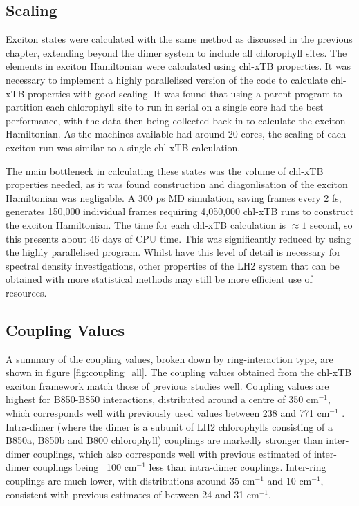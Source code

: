 \subsection{Scaling}
\label{subsec:specdens_scaling}

Exciton states were calculated with the same method as discussed in the previous 
chapter, extending beyond the dimer system to include all chlorophyll sites. The
elements in exciton Hamiltonian were calculated using chl-xTB properties. It was
necessary to implement a highly parallelised version of the code to calculate chl-xTB
properties with good scaling. It was found that using a parent program to partition
each chlorophyll site to run in serial on a single core had the best performance,
with the data then being collected back in to calculate the exciton Hamiltonian.
As the machines available had around 20 cores, the scaling of each exciton run was
similar to a single chl-xTB calculation.

The main bottleneck in calculating these states was the volume of chl-xTB properties
needed, as it was found construction and diagonlisation of the exciton Hamiltonian
was negligable. A 300 ps MD simulation, saving frames every 2 fs, generates 150,000
individual frames requiring 4,050,000 chl-xTB runs to construct the exciton Hamiltonian.
The time for each chl-xTB calculation is $\approx 1$ second, so this presents about
46 days of CPU time. This was significantly reduced by using the highly parallelised
program. Whilst have this level of detail is necessary for spectral density investigations,
other properties of the LH2 system that can be obtained with more statistical methods
may still be more efficient use of resources.

\subsection{Coupling Values}
\label{subsec:coupling_values}

A summary of the coupling values, broken down by ring-interaction type, are shown
in figure \ref{fig:coupling_all}. 
The coupling values obtained from the chl-xTB exciton framework match those of previous
studies well. Coupling values are highest for B850-B850 interactions, distributed
around a centre of 350 $\text{cm}^{-1}$, which corresponds well with previously 
used values between 238 and 771 $\text{cm}^{-1}$ \cite{Cogdell2006}. Intra-dimer
(where the dimer is a subunit of LH2 chlorophylls consisting of a B850a, B850b and
B800 chlorophyll) couplings are markedly stronger than inter-dimer couplings, which
also corresponds well with previous estimated of inter-dimer couplings being ~100 
$\text{cm}^{-1}$ less than intra-dimer couplings. Inter-ring couplings are much 
lower, with distributions around 35 $\text{cm}^{-1}$ and 10 $\text{cm}^{-1}$, consistent
with previous estimates of between 24 and 31 $\text{cm}^{-1}$.

